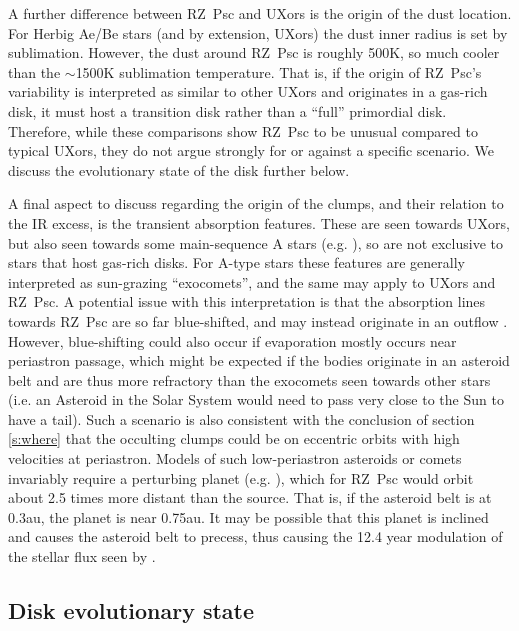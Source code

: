 \documentclass[]{rsos}
\begin{document}
A further difference between RZ~Psc and UXors is the origin of the dust location. For
Herbig Ae/Be stars (and by extension, UXors) the dust inner radius is set by
sublimation. However, the dust around RZ~Psc is roughly 500K, so much cooler than the
$\sim$1500K sublimation temperature. That is, if the origin of RZ~Psc's variability is
interpreted as similar to other UXors and originates in a gas-rich disk, it must host a
transition disk rather than a ``full'' primordial disk. Therefore, while these
comparisons show RZ~Psc to be unusual compared to typical UXors, they do not argue
strongly for or against a specific scenario. We discuss the evolutionary state of the
disk further below.

A final aspect to discuss regarding the origin of the clumps, and their relation to the
IR excess, is the transient absorption features. These are seen towards UXors, but also
seen towards some main-sequence A stars
(e.g. \cite{1987A&A...185..267F,2013PASP..125..759W,2014A&A...561L..10K}), so are not
exclusive to stars that host gas-rich disks. For A-type stars these features are
generally interpreted as sun-grazing ``exocomets'', and the same may apply to UXors and
RZ~Psc. A potential issue with this interpretation is that the absorption lines towards
RZ~Psc are so far blue-shifted, and may instead originate in an outflow
\cite{2013Ap.....56..453P}. However, blue-shifting could also occur if evaporation mostly
occurs near periastron passage, which might be expected if the bodies originate in an
asteroid belt and are thus more refractory than the exocomets seen towards other stars
(i.e. an Asteroid in the Solar System would need to pass very close to the Sun to have a
tail). Such a scenario is also consistent with the conclusion of section \ref{s:where}
that the occulting clumps could be on eccentric orbits with high velocities at
periastron. Models of such low-periastron asteroids or comets invariably require a
perturbing planet (e.g. \cite{1990A&A...236..202B,1996Icar..120..358B}), which for RZ~Psc
would orbit about 2.5 times more distant than the source. That is, if the asteroid belt
is at 0.3au, the planet is near 0.75au. It may be possible that this planet is inclined
and causes the asteroid belt to precess, thus causing the 12.4 year modulation of the
stellar flux seen by \cite{2013A&A...553L...1D}.

\subsection{Disk evolutionary state}\label{ss:evol}
\end{document}
